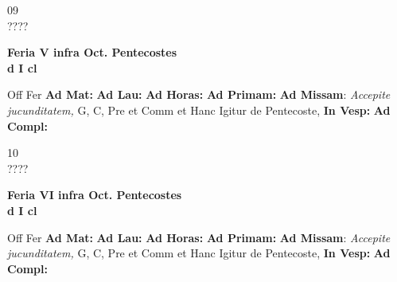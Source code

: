 \documentclass[10pt, openany]{book}
\begin{document}
    \begin{center}
        \begin{minipage}{3.5in}
            \vspace{2em}
            \begin{minipage}{0.5in}
                {\Huge 09} \\
                {\normalsize ????}
            \end{minipage}
            \begin{minipage}{3.0in}
                \textbf{ \large Feria V infra Oct. Pentecostes \\
                \textnormal{\normalsize d I cl}}

            \end{minipage}
            \begin{justify}Off Fer
                \textbf{Ad Mat: }
                \textbf{Ad Lau: }
                \textbf{Ad Horas: }
                \textbf{Ad Primam: }\textbf{Ad Missam}: \textit{Accepite jucunditatem,} G, C, Pre et Comm et Hanc Igitur de Pentecoste, 
                \textbf{In Vesp: }
                \textbf{Ad Compl: }
            \end{justify}
        \end{minipage}
    \end{center}

    \begin{center}
        \begin{minipage}{3.5in}
            \vspace{2em}
            \begin{minipage}{0.5in}
                {\Huge 10} \\
                {\normalsize ????}
            \end{minipage}
            \begin{minipage}{3.0in}
                \textbf{ \large Feria VI infra Oct. Pentecostes \\
                \textnormal{\normalsize d I cl}}

            \end{minipage}
            \begin{justify}Off Fer
                \textbf{Ad Mat: }
                \textbf{Ad Lau: }
                \textbf{Ad Horas: }
                \textbf{Ad Primam: }\textbf{Ad Missam}: \textit{Accepite jucunditatem,} G, C, Pre et Comm et Hanc Igitur de Pentecoste, 
                \textbf{In Vesp: }
                \textbf{Ad Compl: }
            \end{justify}
        \end{minipage}
    \end{center}
\end{document}
